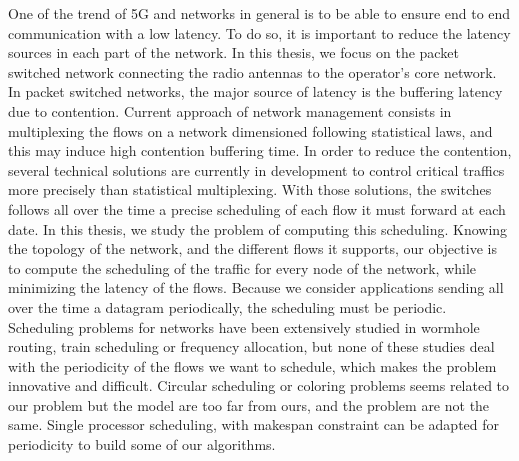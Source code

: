 One of the trend of 5G and networks in general is to be able to ensure end to end communication with a low latency. To do so, it is important to reduce the latency sources in each part of the network. In this thesis, we focus on the packet switched network connecting the radio antennas to the operator's core network. In packet switched networks, the major source of latency is the buffering latency due to contention. Current approach of network management consists in multiplexing the flows on a network dimensioned following statistical laws, and this may induce high contention buffering time. In order to reduce the contention, several technical solutions are currently in development to control critical traffics more precisely than statistical multiplexing. With those solutions, the switches follows all over the time a precise scheduling of each flow it must forward at each date. 
In this thesis, we study the problem of computing this scheduling. Knowing the topology of the network, and the different flows it supports, our objective is to compute the scheduling of the traffic for every node of the network, while minimizing the latency of the flows. Because we consider applications sending all over the time a datagram periodically, the scheduling must be periodic.
Scheduling problems for networks have been extensively studied in wormhole routing, train scheduling or frequency allocation, but none of these studies deal with the periodicity of the flows we want to schedule, which makes the problem innovative and difficult. Circular scheduling or coloring problems seems related to our problem but the model are too far from ours, and the problem are not the same. Single processor scheduling, with makespan constraint can be adapted for periodicity to build some of our algorithms.


